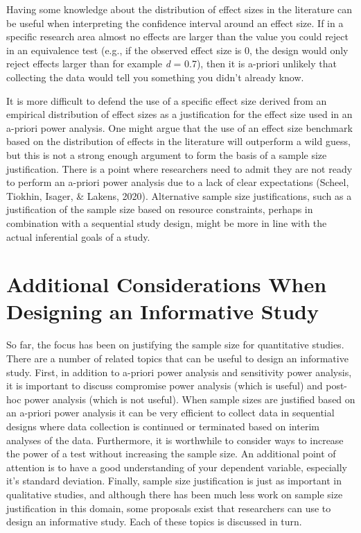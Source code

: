\documentclass[
  english,
  ,jou, a4paper,floatsintext]{apa6}
\begin{document}
Having some knowledge about the distribution of effect sizes in the literature can be useful when interpreting the confidence interval around an effect size. If in a specific research area almost no effects are larger than the value you could reject in an equivalence test (e.g., if the observed effect size is 0, the design would only reject effects larger than for example \emph{d} = 0.7), then it is a-priori unlikely that collecting the data would tell you something you didn't already know.

It is more difficult to defend the use of a specific effect size derived from an empirical distribution of effect sizes as a justification for the effect size used in an a-priori power analysis. One might argue that the use of an effect size benchmark based on the distribution of effects in the literature will outperform a wild guess, but this is not a strong enough argument to form the basis of a sample size justification. There is a point where researchers need to admit they are not ready to perform an a-priori power analysis due to a lack of clear expectations (Scheel, Tiokhin, Isager, \& Lakens, 2020). Alternative sample size justifications, such as a justification of the sample size based on resource constraints, perhaps in combination with a sequential study design, might be more in line with the actual inferential goals of a study.

\hypertarget{additional-considerations-when-designing-an-informative-study}{%
\section{Additional Considerations When Designing an Informative Study}\label{additional-considerations-when-designing-an-informative-study}}

So far, the focus has been on justifying the sample size for quantitative studies. There are a number of related topics that can be useful to design an informative study. First, in addition to a-priori power analysis and sensitivity power analysis, it is important to discuss compromise power analysis (which is useful) and post-hoc power analysis (which is not useful). When sample sizes are justified based on an a-priori power analysis it can be very efficient to collect data in sequential designs where data collection is continued or terminated based on interim analyses of the data. Furthermore, it is worthwhile to consider ways to increase the power of a test without increasing the sample size. An additional point of attention is to have a good understanding of your dependent variable, especially it's standard deviation. Finally, sample size justification is just as important in qualitative studies, and although there has been much less work on sample size justification in this domain, some proposals exist that researchers can use to design an informative study. Each of these topics is discussed in turn.
\end{document}
